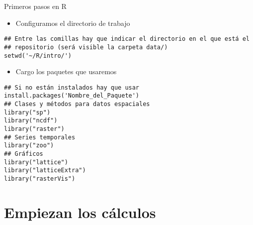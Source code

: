 \documentclass[xcolor={usenames,svgnames,dvipsnames}]{beamer}
\begin{document}
\begin{frame}[fragile,label=sec-1-3]{Primeros pasos en R}
 \begin{itemize}
\item Configuramos el directorio de trabajo
\end{itemize}
\lstset{language=R,numbers=none}
\begin{lstlisting}
## Entre las comillas hay que indicar el directorio en el que está el
## repositorio (será visible la carpeta data/)
setwd('~/R/intro/')
\end{lstlisting}
\begin{itemize}
\item Cargo los paquetes que usaremos
\end{itemize}
\lstset{language=R,numbers=none}
\begin{lstlisting}
## Si no están instalados hay que usar install.packages('Nombre_del_Paquete')
## Clases y métodos para datos espaciales
library("sp")
library("ncdf")
library("raster")
## Series temporales
library("zoo")
## Gráficos
library("lattice")
library("latticeExtra")
library("rasterVis")
\end{lstlisting}
\end{frame}
\section{Empiezan los cálculos}
\label{sec-2}
\end{document}
